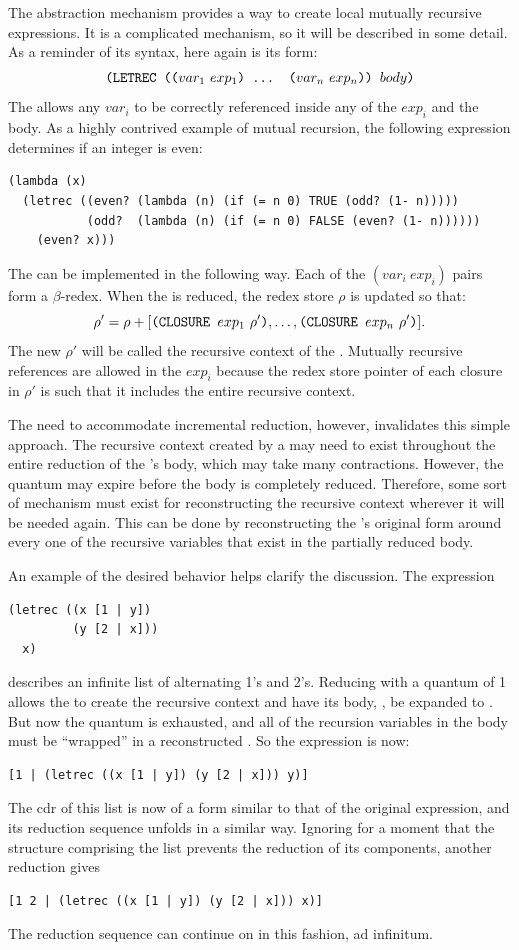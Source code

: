 The  abstraction mechanism provides a way to create local mutually
recursive expressions. It is a complicated mechanism, so it will be described in
some detail. As a reminder of its syntax, here again is its form:
\[
\texttt{(LETREC ((}var_1\ exp_1\texttt{) ... (}var_n\ exp_n\texttt{)) }body\texttt{)}
\]
The  allows any \(var_i\) to be correctly referenced inside any of
the \(exp_i\) and the body. As a highly contrived example of mutual recursion,
the following expression determines if an integer is even:
\begin{verbatim}
(lambda (x)
  (letrec ((even? (lambda (n) (if (= n 0) TRUE (odd? (1- n)))))
           (odd?  (lambda (n) (if (= n 0) FALSE (even? (1- n))))))
    (even? x)))
\end{verbatim}

The  can be implemented in the following way. Each of the
\((var_i\ exp_i)\) pairs form a \(\beta\)-redex. When the  is
reduced, the redex store \(\rho\) is updated so that:
\[
\rho'=\rho+[\THOR{(CLOSURE }exp_1\ \rho'\THOR{)},\ldots,
             \THOR{(CLOSURE }exp_n\ \rho'\THOR{)}].
\]
The new \(\rho'\) will be called the recursive context of the .
Mutually recursive references are allowed in the \(exp_i\) because the redex
store pointer of each closure in \(\rho'\) is such that it includes the entire
recursive context.

The need to accommodate incremental reduction, however, invalidates this simple
approach. The recursive context created by a  may need to exist
throughout the entire reduction of the 's body, which may take many
contractions. However, the quantum may expire before the body is completely
reduced. Therefore, some sort of mechanism must exist for reconstructing the
recursive context wherever it will be needed again. This can be done by
reconstructing the 's original form around every one of the
recursive variables that exist in the partially reduced body.

An example of the desired behavior helps clarify the discussion. The expression
\begin{verbatim}
(letrec ((x [1 | y])
         (y [2 | x]))
  x)
\end{verbatim}
describes an infinite list of alternating 1's and 2's. Reducing with a quantum
of 1 allows the  to create the recursive context and have its body,
, be expanded to \THOR{[1 | y]}. But now the quantum is exhausted, and
all of the recursion variables in the body must be ``wrapped'' in a
reconstructed . So the expression is now:
\begin{verbatim}
[1 | (letrec ((x [1 | y]) (y [2 | x])) y)]
\end{verbatim}
The cdr of this list is now of a form similar to that of the original
expression, and its reduction sequence unfolds in a similar way. Ignoring for a
moment that the  structure comprising the list prevents the reduction
of its components, another reduction gives
\begin{verbatim}
[1 2 | (letrec ((x [1 | y]) (y [2 | x])) x)]
\end{verbatim}
The reduction sequence can continue on in this fashion, ad infinitum.

